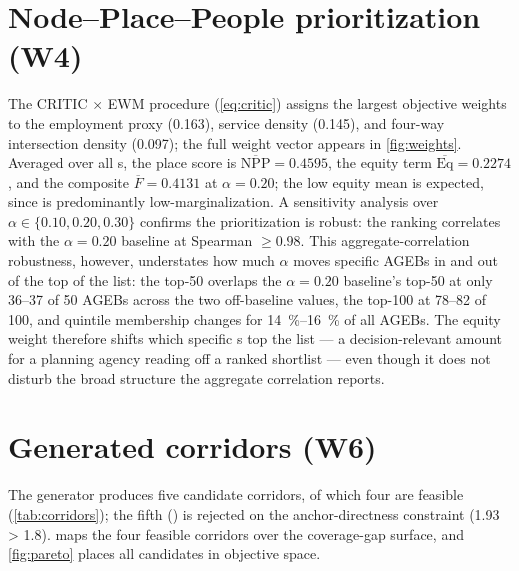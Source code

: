 \section{Node--Place--People prioritization (W4)}
\label{sec:res-w4}

The CRITIC$\,\times\,$EWM procedure (\cref{eq:critic}) assigns the largest objective
weights to the employment proxy (\num{0.163}), service density (\num{0.145}), and
four-way intersection density (\num{0.097}); the full weight vector appears in
\cref{fig:weights}. Averaged over all \ageb{}s, the place score is
$\overline{\mathrm{NPP}} = \num{0.4595}$, the equity term
$\overline{\mathrm{Eq}} = \num{0.2274}$, and the composite
$\overline{F} = \num{0.4131}$ at $\alpha = \num{0.20}$; the low equity mean is
expected, since \zmg is predominantly low-marginalization. A sensitivity analysis
over $\alpha \in \{0.10, 0.20, 0.30\}$ confirms the prioritization is robust: the
ranking correlates with the $\alpha = \num{0.20}$ baseline at Spearman
$\ge \num{0.98}$. This aggregate-correlation robustness, however, understates how much
$\alpha$ moves specific AGEBs in and out of the top of the list: the top-50 overlaps
the $\alpha=0.20$ baseline's top-50 at only \num{36}--\num{37} of \num{50} AGEBs across
the two off-baseline values, the top-100 at \num{78}--\num{82} of \num{100}, and
quintile membership changes for \SI{14}{\percent}--\SI{16}{\percent} of all AGEBs. The
equity weight therefore shifts which specific \ageb{}s top the list --- a
decision-relevant amount for a planning agency reading off a ranked shortlist --- even
though it does not disturb the broad structure the aggregate correlation reports.

\section{Generated corridors (W6)}
\label{sec:res-w6}

The generator produces five candidate corridors, of which four are feasible
(\cref{tab:corridors}); the fifth () is rejected on the
anchor-directness constraint (\num{1.93} > \num{1.8}).  maps the
four feasible corridors over the coverage-gap surface, and \cref{fig:pareto} places
all candidates in objective space.

